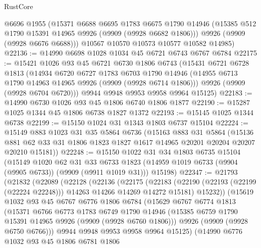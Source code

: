 \begin{lexlean}{RustCore}
\begin{coremodule}
      @6696
      @1955
      (@15371
        @6688
        @6695
        @1783
        @6675
        @1790
        @14946
        (@15385 @512 @1790 @15391 @14965 @9926 (@9909 (@9928 @6682 @1806)))
        @9926
        (@9909 (@9928 @6676 @6688)))
      @10567
      @10570
      @10573
      @10577
      @10582
      @14985)
@22136 := @14990 @6698 @1028 @1034 @45 @6721 @6743 @6767 @6784
@22175 := @15421
    @1026
    @93
    @45
    @6721
    @6730
    @1806
    @6743
    (@15431
      @6721
      @6728
      @1813
      (@14934
        @6720
        @6727
        @1783
        @6703
        @1790
        @14946
        (@14955 @6713 @1790 @14963 @14965 @9926 (@9909 (@9928 @6714 @1806)))
        @9926
        (@9909 (@9928 @6704 @6720)))
      @9944
      @9948
      @9953
      @9958
      @9964
      @15125)
@22183 := @14990 @6730 @1026 @93 @45 @1806 @6740 @1806 @1877
@22190 := @15287 @1025 @1344 @45 @1806 @6738 @1827 @1372
@22193 := @15145 @1025 @1344 @6738
@22199 := @15150 @1024 @31 @1343 @1803 @6737 @15104
@22224 := @15149
    @883
    @1023
    @31
    @35
    @5864
    @6736
    (@15163
      @883
      @31
      @5864
      (@15136 @881 @62 @33 @31 @1806 @1823 @1827 @1617 @14965 @20201 @20204 @20207 @20210 @15181))
@22248 := @15150
    @1022
    @31
    @34
    @1803
    @6735
    @15104
    (@15149
      @1020
      @62
      @31
      @33
      @6733
      @1823
      (@14959 @1019 @6733 (@9904 (@9905 @6733)) (@9909 (@9911 @1019 @31)))
      @15198)
@22347 := @21793
    (@21832
      (@22089
        (@22128
          (@22136
            (@22175
              (@22183
                (@22190 (@22193 (@22199 (@22224 @22248))) @14263 @14266 @14269 @14272 @15181)
                @15232))
            (@15619
              @1032
              @93
              @45
              @6767
              @6776
              @1806
              @6784
              (@15629
                @6767
                @6774
                @1813
                (@15371
                  @6766
                  @6773
                  @1783
                  @6749
                  @1790
                  @14946
                  (@15385 @6759 @1790 @15391 @14965 @9926 (@9909 (@9928 @6760 @1806)))
                  @9926
                  (@9909 (@9928 @6750 @6766)))
                @9944
                @9948
                @9953
                @9958
                @9964
                @15125)
              (@14990
                @6776
                @1032
                @93
                @45
                @1806
                @6781
                @1806

\end{coremodule}
\end{lexlean}
